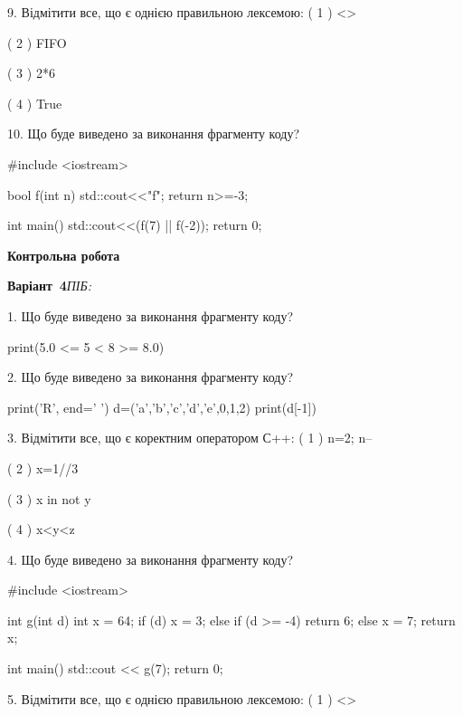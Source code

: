 \documentclass[11pt]{article}
\begin{document}
9. %
Відмітити все, що є однією правильною лексемою:
( 1 ) <>

( 2 ) FIFO

( 3 ) 2*6

( 4 ) True

10. Що буде виведено за виконання фрагменту коду?

#include <iostream>

bool f(int n){
    std::cout<<"f";
    return n>=-3;
}

int main(){
    std::cout<<(f(7) || f(-2));
    return 0;
}











\newpage

\newpage

{\large\textbf{Контрольна робота}}

\textbf{Варіант \No\,4}\hfill \textit{ПІБ:}\,\underline{\hspace{60mm}}
\vspace{4mm}

1. Що буде виведено за виконання фрагменту коду?

print(5.0 <= 5 < 8 >= 8.0)

2. Що буде виведено за виконання фрагменту коду?

print('R', end=' ')
d=('a','b','c','d','e',0,1,2)
print(d[-1])


3. %
Відмітити все, що є коректним оператором С++:
( 1 ) n=2; n--

( 2 ) x=1//3

( 3 ) x in not y

( 4 ) x<y<z

4. Що буде виведено за виконання фрагменту коду?

#include <iostream>

int g(int d){
    int x = 64;
    if (d) 
        x = 3;
    else if (d >= -4)
         return 6;
    else
         x = 7;
    return x;
}

int main(){
    std::cout << g(7);
    return 0;
}


5. %
Відмітити все, що є однією правильною лексемою:
( 1 ) <>
\end{document}
